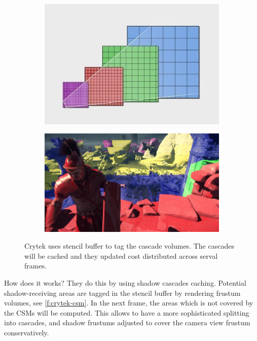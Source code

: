 \begin{figure}\label{f:crytek-csm}
\begin{center}
	\begin{subfigure}[b]{0.442\textwidth}
		\includegraphics[width=1.0\textwidth]{graphics/shadows/crytek-csms-1}	
	\end{subfigure}
	\begin{subfigure}[b]{0.54\textwidth}
		\includegraphics[width=1.0\textwidth]{graphics/shadows/crytek-csms-2}	
	\end{subfigure}
\end{center}
\caption{Crytek uses stencil buffer to tag the cascade volumes. The cascades will be cached and they updated cost distributed across serval frames.}
\end{figure}

How does it works? They do this by using shadow cascades caching. Potential shadow-receiving areas are tagged in the stencil buffer by rendering frustum volumes, see \ref{f:crytek-csm}. In the next frame, the areas which is not covered by the CSMs will be computed. This allows to have a more sophisticated splitting into cascades, and shadow frustums adjusted to cover the camera view frustum conservatively.   

